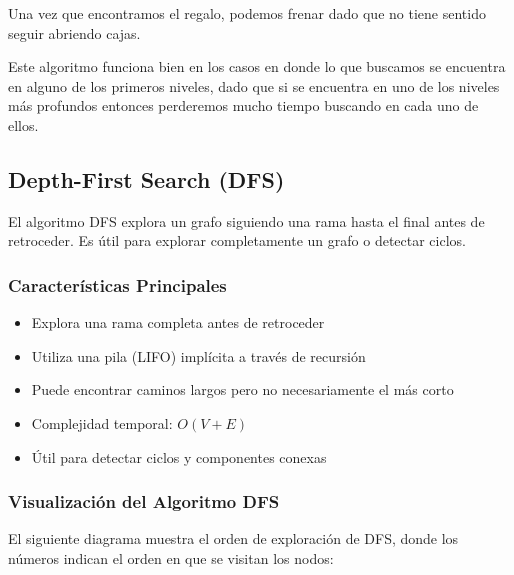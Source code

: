 \documentclass[12pt]{article}
\begin{document}
Una vez que encontramos el regalo, podemos frenar dado que no tiene sentido seguir abriendo cajas.

\vspace{0.5em}

Este algoritmo funciona bien en los casos en donde lo que buscamos se encuentra en alguno de los primeros niveles, dado que si se encuentra en uno de los niveles más profundos entonces perderemos mucho tiempo buscando en cada uno de ellos.

\subsection{Depth-First Search (DFS)}
El algoritmo DFS explora un grafo siguiendo una rama hasta el final antes de retroceder. Es útil para explorar completamente un grafo o detectar ciclos.

\subsubsection{Características Principales}
\begin{itemize}
    \item Explora una rama completa antes de retroceder
    \item Utiliza una pila (LIFO) implícita a través de recursión
    \item Puede encontrar caminos largos pero no necesariamente el más corto
    \item Complejidad temporal: $O(V + E)$
    \item Útil para detectar ciclos y componentes conexas
\end{itemize}

\subsubsection{Visualización del Algoritmo DFS}

El siguiente diagrama muestra el orden de exploración de DFS, donde los números indican el orden en que se visitan los nodos:

\vspace{0.3em}
\end{document}
